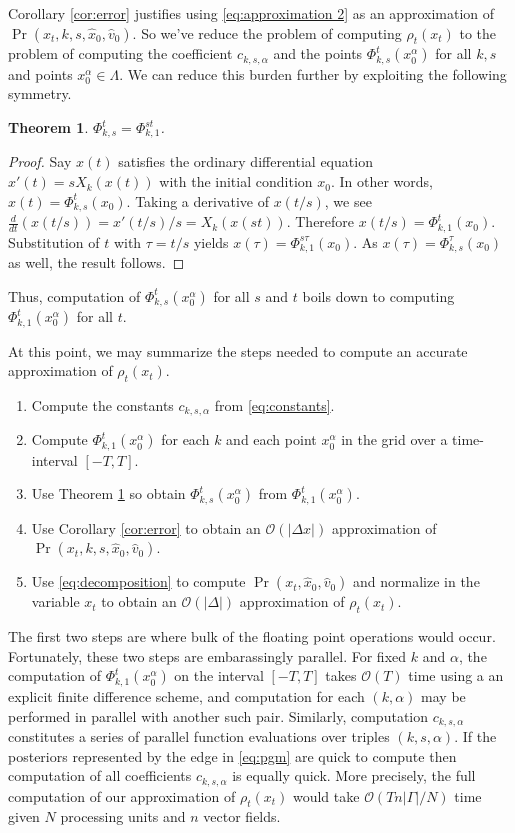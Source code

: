 \documentclass[conference]{IEEEtran}
\newtheorem{thm}{Theorem}
\begin{document}
Corollary \ref{cor:error} justifies using \eqref{eq:approximation 2} as an approximation of $\Pr( x_t, k,s,\hat{x}_0, \hat{v}_0)$.
So we've reduce the problem of computing $\rho_t(x_t)$ to the problem of computing the coefficient $c_{k,s,\alpha}$ and the points $\Phi_{k,s}^t(x_0^\alpha)$ for all $k,s$ and points $x_0^{\alpha} \in \Lambda$.
We can reduce this burden further by exploiting the following symmetry.
\begin{thm} \label{thm:symmetry}
	$\Phi_{k,s}^t = \Phi_{k,1}^{st}$.
\end{thm}
\begin{proof}
	Say $x(t)$ satisfies the ordinary differential equation $x'(t) = sX_k(x(t))$ with the initial condition $x_0$.
	In other words, $x(t) = \Phi_{k,s}^{t}(x_0)$.
	Taking a derivative of $x(t/s)$, we see $\frac{d}{dt} (x(t/s)) = x'(t/s) /s = X_k(x(st))$.
	Therefore $x(t/s) = \Phi_{k,1}^{t}( x_0)$.
	Substitution of $t$ with $\tau = t/s$ yields $x(\tau) = \Phi_{k,1}^{s \tau} (x_0)$.
	As $x(\tau) = \Phi_{k,s}^{\tau}(x_0)$ as well, the result follows.
\end{proof}

Thus, computation of $\Phi_{k,s}^t( x_0^{\alpha})$ for all $s$ and $t$ boils down to computing $\Phi_{k,1}^t(x_0^{\alpha})$ for all $t$.

At this point, we may summarize the steps needed to compute an accurate approximation of $\rho_t(x_t)$.
\begin{enumerate}
	\item Compute the constants $c_{k,s,\alpha}$ from \eqref{eq:constants}.
	\item Compute $\Phi_{k,1}^t(x_0^{\alpha})$ for each $k$ and each point $x_0^{\alpha}$ in the grid over a time-interval $[-T,T]$.
	\item Use Theorem \ref{thm:symmetry} so obtain $\Phi_{k,s}^t( x_0^\alpha)$ from $\Phi_{k,1}^t(x_0^{\alpha})$.
	\item Use Corollary \ref{cor:error} to obtain an $\mathcal{O}( | \Delta x | )$ approximation of $\Pr(x_t ,k,s,\hat{x}_0 , \hat{v}_0)$.
	\item Use \eqref{eq:decomposition} to compute $\Pr( x_t, \hat{x}_0, \hat{v}_0)$ and normalize in the variable $x_t$ to obtain an $\mathcal{O}( | \Delta |)$ approximation of  $\rho_t( x_t)$. 
\end{enumerate}
The first two steps are where bulk of the floating point operations would occur.
Fortunately, these two steps are embarassingly parallel.
For fixed $k$ and $\alpha$, the computation of $\Phi_{k,1}^t(x_0^{\alpha})$ on the interval $[-T,T]$ takes $\mathcal{O}(T)$ time using a an explicit finite difference scheme, and computation for each $(k,\alpha)$ may be performed in parallel with another such pair.
Similarly, computation $c_{k,s,\alpha}$ constitutes a series of parallel function evaluations over triples $(k,s,\alpha)$.
If the posteriors represented by the edge in \eqref{eq:pgm} are quick to compute then computation of all coefficients $c_{k,s,\alpha}$ is equally quick.
More precisely, the full computation of our approximation of $\rho_t(x_t)$ would take $\mathcal{O}( T n | \Gamma | / N )$ time given $N$ processing units and $n$ vector fields.
\end{document}
